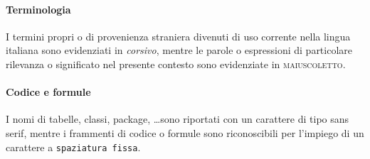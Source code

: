 \paragraph{Terminologia} I termini propri o di provenienza straniera divenuti di uso corrente nella lingua italiana sono evidenziati in \textit{corsivo}, mentre le parole o espressioni di particolare rilevanza o significato nel presente contesto sono evidenziate in \textsc{maiuscoletto}.

\paragraph{Codice e formule} I nomi di tabelle, classi, package, \ldots sono riportati con un carattere di tipo \textsf{sans serif}, mentre i frammenti di codice o formule sono riconoscibili per l'impiego di un carattere a \texttt{spaziatura fissa}.
